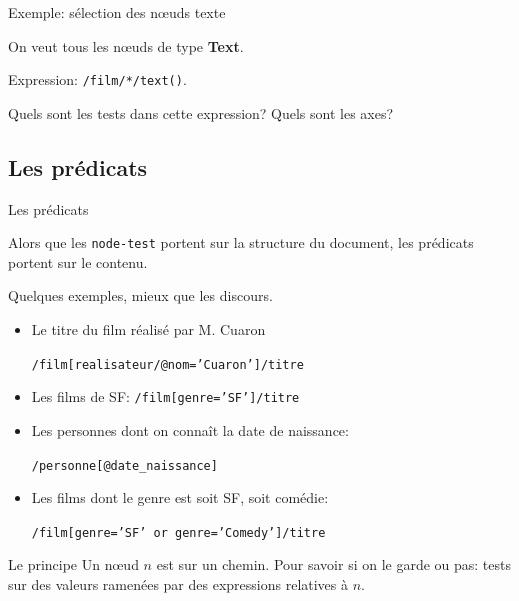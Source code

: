 \begin{frame}{Exemple: sélection des nœuds texte}

On veut tous les nœuds de type \textbf{Text}.

\vfill

Expression: \texttt{/film/*/text()}.


\vfill

Quels sont les tests dans cette expression? Quels sont les axes?

\end{frame}




\subsection{Les prédicats}

\begin{frame}{Les prédicats}

Alors que les \texttt{node-test} portent sur la \alert{structure} du document,
les \alert{prédicats} portent sur le contenu.

\vfill

Quelques exemples, mieux que les discours.


\begin{itemize}
\item Le titre du film réalisé par M. Cuaron
 
	\texttt{/film[realisateur/@nom='Cuaron']/titre}
	
\item Les films de SF: \texttt{/film[genre='SF']/titre}

\item Les personnes dont on connaît la date de naissance:

    \texttt{/personne[@date\_naissance]}
    
 \item Les films dont le genre est soit SF, soit comédie:
 
   \texttt{/film[genre='SF' or genre='Comedy']/titre}
\end{itemize}

\begin{block}{Le principe}
Un nœud $n$ est sur un chemin. Pour savoir si on le garde ou pas: tests
sur des \alert{valeurs} ramenées par des expressions \alert{relatives} à $n$.  
\end{block}
\end{frame}


